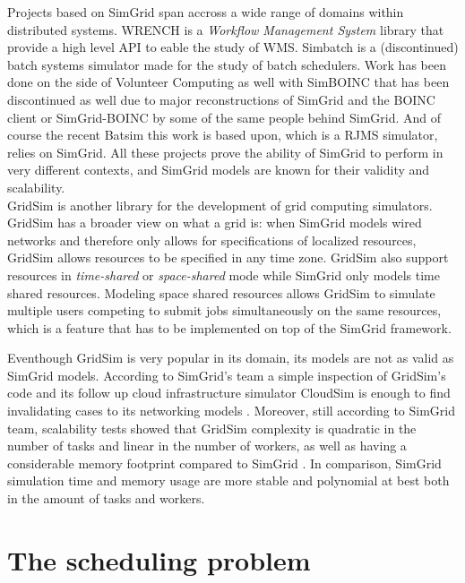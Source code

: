 Projects based on SimGrid span accross a wide range of domains within
distributed systems. WRENCH \cite{wrench} is a \textit{Workflow Management
System} library that provide a high level API to eable the study of WMS.
Simbatch \cite{simbatch} is a (discontinued) batch systems simulator made for
the study of batch schedulers.  Work has been done on the side of Volunteer
Computing as well with SimBOINC \cite{kondo2007simboinc} that has been
discontinued as well due to major reconstructions of SimGrid and the BOINC
client or SimGrid-BOINC \cite{simgrid-boinc} by some of the same people behind
SimGrid. And of course the recent Batsim \cite{dutot:hal-01333471} this work is
based upon, which is a RJMS simulator, relies on SimGrid. All these projects
prove the ability of SimGrid to perform in very different contexts, and SimGrid
models are known for their validity and scalability.\\

GridSim \cite{gridsim} is another library for the development of grid computing
simulators. GridSim has a broader view on what a grid is: when SimGrid models
wired networks and therefore only allows for specifications of localized
resources, GridSim allows resources to be specified in any time zone. GridSim
also support resources in \textit{time-shared} or \textit{space-shared} mode
while SimGrid only models time shared resources. Modeling space shared
resources allows GridSim to simulate multiple users competing to submit jobs
simultaneously on the same resources, which is a feature that has to  be
implemented on top of the SimGrid framework. 

Eventhough GridSim is very popular in its domain, its models are not as valid
as SimGrid models. According to SimGrid's team a simple inspection of GridSim's
code and its follow up cloud infrastructure simulator CloudSim \cite{cloudsim}
is enough to find invalidating cases to its networking models
\cite{10.1145/2517448}. Moreover, still according to SimGrid team, scalability
tests showed that GridSim complexity is quadratic in the number of tasks and
linear in the number of workers, as well as having a considerable memory
footprint compared to SimGrid \cite{casanova:hal-01017319}. In comparison,
SimGrid simulation time and memory usage are more stable and polynomial at best
both in the amount of tasks and workers.

\section{The scheduling problem}


